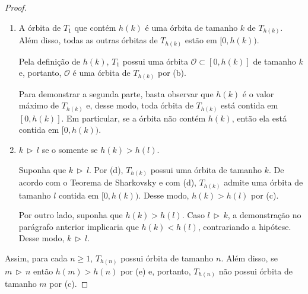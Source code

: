 \begin{proof}
\begin{enumerate}[label = (\alph*)]
\item A órbita de $T_1$ que contém $h(k)$ é uma órbita de tamanho $k$ de $T_{h(k)}$. Além disso, todas as outras órbitas de $T_{h(k)}$ estão em $[0, h(k))$. 

Pela definição de $h(k)$, $T_1$ possui uma órbita $\mathcal{O} \subset [0, h(k)]$ de tamanho $k$ e, portanto, $\mathcal{O}$ é uma órbita de $T_{h(k)}$ por (b).

Para demonstrar a segunda parte, basta observar que $h(k)$ é o valor máximo de $T_{h(k)}$ e, desse modo, toda órbita de $T_{h(k)}$ está contida em $[0, h(k)]$. Em particular, se a órbita não contém $h(k)$, então ela está contida em $[0, h(k))$.

\item $k \,\triangleright\, l$ se o somente se $h(k) > h(l)$.

Suponha que $k \,\triangleright\, l$. Por (d), $T_{h(k)}$ possui uma órbita de tamanho $k$. De acordo com o Teorema de Sharkovsky e com (d), $T_{h(k)}$ admite uma órbita de tamanho $l$ contida em $[0, h(k))$. Desse modo,  $h(k) > h(l)$ por (c).

Por outro lado, suponha que $h(k) > h(l)$. Caso $l \,\triangleright\, k$, a demonstração no parágrafo anterior implicaria que $h(k) < h(l)$, contrariando a hipótese. Desse modo, $k \,\triangleright\, l$.
\end{enumerate}

Assim, para cada $n \geq 1$, $T_{h(n)}$ possui órbita de tamanho $n$. Além disso, se $m \,\triangleright\, n$ então $h(m) > h(n)$ por (e) e, portanto, $T_{h(n)}$ não possui órbita de tamanho $m$ por (c).
\end{proof}